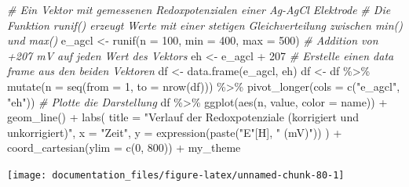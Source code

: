 \documentclass[
]{article}
\newenvironment{Shaded}{\begin{snugshade}}{\end{snugshade}}
\newcommand{\AttributeTok}[1]{\textcolor[rgb]{0.77,0.63,0.00}{#1}}
\newcommand{\CommentTok}[1]{\textcolor[rgb]{0.56,0.35,0.01}{\textit{#1}}}
\newcommand{\DecValTok}[1]{\textcolor[rgb]{0.00,0.00,0.81}{#1}}
\newcommand{\FunctionTok}[1]{\textcolor[rgb]{0.00,0.00,0.00}{#1}}
\newcommand{\NormalTok}[1]{#1}
\newcommand{\OtherTok}[1]{\textcolor[rgb]{0.56,0.35,0.01}{#1}}
\newcommand{\SpecialCharTok}[1]{\textcolor[rgb]{0.00,0.00,0.00}{#1}}
\newcommand{\StringTok}[1]{\textcolor[rgb]{0.31,0.60,0.02}{#1}}
\begin{document}
\begin{Shaded}
\begin{Highlighting}[]
\CommentTok{\# Ein Vektor mit gemessenen Redoxpotenzialen einer Ag{-}AgCl Elektrode}
\CommentTok{\# Die Funktion \textasciigrave{}runif()\textasciigrave{} erzeugt Werte mit einer stetigen Gleichverteilung zwischen min() und max()}
\NormalTok{e\_agcl }\OtherTok{\textless{}{-}} \FunctionTok{runif}\NormalTok{(}\AttributeTok{n =} \DecValTok{100}\NormalTok{, }\AttributeTok{min =} \DecValTok{400}\NormalTok{, }\AttributeTok{max =} \DecValTok{500}\NormalTok{)}
\CommentTok{\# Addition von +207 mV auf jeden Wert des Vektors }
\NormalTok{eh }\OtherTok{\textless{}{-}}\NormalTok{ e\_agcl }\SpecialCharTok{+} \DecValTok{207}
\CommentTok{\# Erstelle einen data frame aus den beiden Vektoren }
\NormalTok{df }\OtherTok{\textless{}{-}} \FunctionTok{data.frame}\NormalTok{(e\_agcl, eh) }
\NormalTok{df }\OtherTok{\textless{}{-}}\NormalTok{ df }\SpecialCharTok{\%\textgreater{}\%}
    \FunctionTok{mutate}\NormalTok{(}\AttributeTok{n =} \FunctionTok{seq}\NormalTok{(}\AttributeTok{from =} \DecValTok{1}\NormalTok{, }\AttributeTok{to =} \FunctionTok{nrow}\NormalTok{(df))) }\SpecialCharTok{\%\textgreater{}\%} 
    \FunctionTok{pivot\_longer}\NormalTok{(}\AttributeTok{cols =} \FunctionTok{c}\NormalTok{(}\StringTok{"e\_agcl"}\NormalTok{, }\StringTok{"eh"}\NormalTok{))}
\CommentTok{\# Plotte die Darstellung}
\NormalTok{df }\SpecialCharTok{\%\textgreater{}\%}
    \FunctionTok{ggplot}\NormalTok{(}\FunctionTok{aes}\NormalTok{(n, value, }\AttributeTok{color =}\NormalTok{ name)) }\SpecialCharTok{+}
    \FunctionTok{geom\_line}\NormalTok{() }\SpecialCharTok{+}
    \FunctionTok{labs}\NormalTok{(}
        \AttributeTok{title =} \StringTok{"Verlauf der Redoxpotenziale (korrigiert und unkorrigiert)"}\NormalTok{, }
        \AttributeTok{x =} \StringTok{"Zeit"}\NormalTok{, }
        \AttributeTok{y =} \FunctionTok{expression}\NormalTok{(}\FunctionTok{paste}\NormalTok{(}\StringTok{"E"}\NormalTok{[H], }\StringTok{" (mV)"}\NormalTok{))}
\NormalTok{    ) }\SpecialCharTok{+}
    \FunctionTok{coord\_cartesian}\NormalTok{(}\AttributeTok{ylim =} \FunctionTok{c}\NormalTok{(}\DecValTok{0}\NormalTok{, }\DecValTok{800}\NormalTok{)) }\SpecialCharTok{+}
\NormalTok{    my\_theme}
\end{Highlighting}
\end{Shaded}

\begin{center}\texttt{[image: documentation\_files/figure-latex/unnamed-chunk-80-1]} \end{center}
\end{document}
